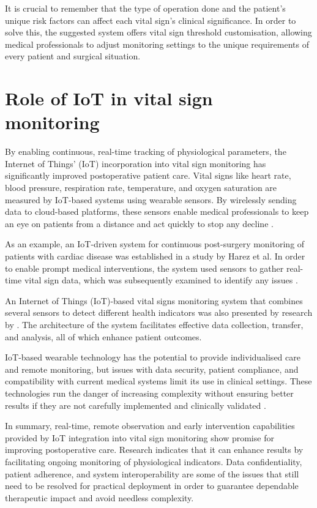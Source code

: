 It is crucial to remember that the type of operation done and the patient's unique risk factors can affect each vital sign's clinical significance. In order to solve this, the suggested system offers vital sign threshold customisation, allowing medical professionals to adjust monitoring settings to the unique requirements of every patient and surgical situation.

\section{Role of IoT in vital sign monitoring} %
By enabling continuous, real-time tracking of physiological parameters, the Internet of Things' (IoT) incorporation into vital sign monitoring has significantly improved postoperative patient care. Vital signs like heart rate, blood pressure, respiration rate, temperature, and oxygen saturation are measured by IoT-based systems using wearable sensors. By wirelessly sending data to cloud-based platforms, these sensors enable medical professionals to keep an eye on patients from a distance and act quickly to stop any decline \cite{Olusegun_2025_RT_patient}.

As an example, an IoT-driven system for continuous post-surgery monitoring of patients with cardiac disease was established in a study by Harez et al. In order to enable prompt medical interventions, the system used sensors to gather real-time vital sign data, which was subsequently examined to identify any issues \cite{Harez_2024pxm}.

An Internet of Things (IoT)-based vital signs monitoring system that combines several sensors to detect different health indicators was also presented by research by \cite{Sundaravadivel_IoT_vital_signs}. The architecture of the system facilitates effective data collection, transfer, and analysis, all of which enhance patient outcomes.

IoT-based wearable technology has the potential to provide individualised care and remote monitoring, but issues with data security, patient compliance, and compatibility with current medical systems limit its use in clinical settings. These technologies run the danger of increasing complexity without ensuring better results if they are not carefully implemented and clinically validated \cite{Hamed_Wearable_Healthcare}.

In summary, real-time, remote observation and early intervention capabilities provided by IoT integration into vital sign monitoring show promise for improving postoperative care. Research indicates that it can enhance results by facilitating ongoing monitoring of physiological indicators. Data confidentiality, patient adherence, and system interoperability are some of the issues that still need to be resolved for practical deployment in order to guarantee dependable therapeutic impact and avoid needless complexity.

